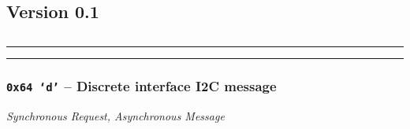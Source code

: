 \subsection{Version 0.1}
\label{protocol-0-1}

\setcounter{tocdepth}{4}
\etocsettocstyle
    {\subsection*{\contentsname}\hrule\medskip
        }
    {\nobreak\medskip\hrule\bigskip}

\localtableofcontents

\subsubsection{\texttt{0x64 `d'} -- Discrete interface I2C message}
{\em Synchronous Request, Asynchronous Message}
